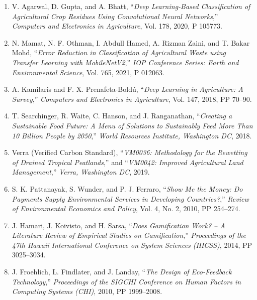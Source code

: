 \documentclass[a4paper,12pt,oneside]{report}
\let\originalitem\item
\renewcommand{\item}{\Needspace{10\baselineskip}\originalitem}
\begin{document}
\begin{enumerate}
    \item[{[35]}] \label{bib:agarwal2020} V. Agarwal, D. Gupta, and A. Bhatt, ``\textit{Deep Learning-Based Classification of Agricultural Crop Residues Using Convolutional Neural Networks},'' \textit{Computers and Electronics in Agriculture}, Vol. 178, 2020, P 105773.

    \item[{[36]}] \label{bib:mamat2021} N. Mamat, N. F. Othman, I. Abdull Hamed, A. Rizman Zaini, and T. Bakar Mohd, ``\textit{Error Reduction in Classification of Agricultural Waste using Transfer Learning with MobileNetV2},'' \textit{IOP Conference Series: Earth and Environmental Science}, Vol. 765, 2021, P 012063.

    \item[{[37]}] \label{bib:kamilaris2018} A. Kamilaris and F. X. Prenafeta-Bold\'u, ``\textit{Deep Learning in Agriculture: A Survey},'' \textit{Computers and Electronics in Agriculture}, Vol. 147, 2018, PP 70--90.

    \item[{[38]}] \label{bib:searchinger2018} T. Searchinger, R. Waite, C. Hanson, and J. Ranganathan, ``\textit{Creating a Sustainable Food Future: A Menu of Solutions to Sustainably Feed More Than 10 Billion People by 2050},'' \textit{World Resources Institute, Washington DC}, 2018.

    \item[{[39]}] \label{bib:verra2019} Verra (Verified Carbon Standard), ``\textit{VM0036: Methodology for the Rewetting of Drained Tropical Peatlands},'' and ``\textit{VM0042: Improved Agricultural Land Management},'' \textit{Verra, Washington DC}, 2019.

    \item[{[40]}] \label{bib:pattanayak2010} S. K. Pattanayak, S. Wunder, and P. J. Ferraro, ``\textit{Show Me the Money: Do Payments Supply Environmental Services in Developing Countries?},'' \textit{Review of Environmental Economics and Policy}, Vol. 4, No. 2, 2010, PP 254--274.

    \item[{[41]}] \label{bib:hamari2014} J. Hamari, J. Koivisto, and H. Sarsa, ``\textit{Does Gamification Work? -- A Literature Review of Empirical Studies on Gamification},'' \textit{Proceedings of the 47th Hawaii International Conference on System Sciences (HICSS)}, 2014, PP 3025--3034.

    \item[{[42]}] \label{bib:froehlich2009} J. Froehlich, L. Findlater, and J. Landay, ``\textit{The Design of Eco-Feedback Technology},'' \textit{Proceedings of the SIGCHI Conference on Human Factors in Computing Systems (CHI)}, 2010, PP 1999--2008.


\end{enumerate}
\end{document}
